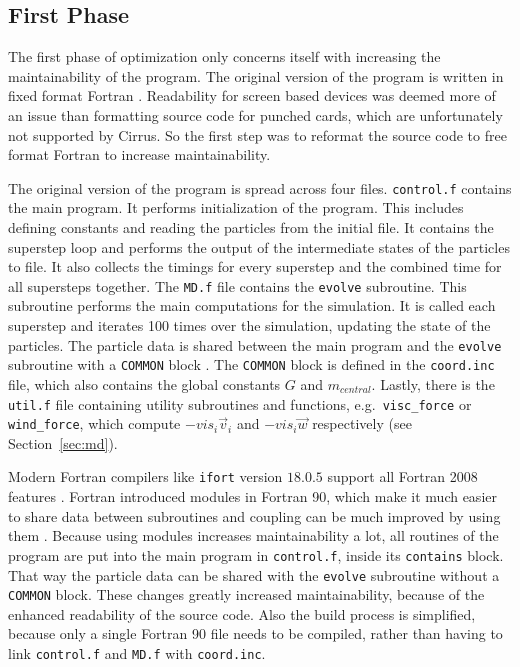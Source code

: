 \documentclass[twoside,11pt]{article}
\begin{document}
\subsection{First Phase} %
\label{subsec:p1}

The first phase of optimization only concerns itself with increasing
the maintainability of the program.
The original version of the program is written in fixed format
Fortran \citep[see e.g.][for free vs.\ fixed format Fortran]
{fortran_free_fixed}.
Readability for screen based devices was deemed more of an issue than
formatting source code for punched cards, which are unfortunately not
supported by Cirrus.
So the first step was to reformat the source code to free format
Fortran to increase maintainability.

The original version of the program is spread across four files.
\texttt{control.f} contains the main program.
It performs initialization of the program.
This includes defining constants and reading the particles from the
initial file.
It contains the superstep loop and performs the output of the
intermediate states of the particles to file.
It also collects the timings for every superstep and the combined
time for all supersteps together.
The \texttt{MD.f} file contains the \texttt{evolve} subroutine.
This subroutine performs the main computations for the simulation.
It is called each superstep and iterates 100 times over the
simulation, updating the state of the particles.
The particle data is shared between the main program and the
\texttt{evolve} subroutine with a \texttt{COMMON} block
\citep[see e.g.][]{fortran_common}.
The \texttt{COMMON} block is defined in the \texttt{coord.inc} file,
which also contains the global constants $G$ and $m_{central}$.
Lastly, there is the \texttt{util.f} file containing utility
subroutines and functions, e.g.\ \texttt{visc\_force} or
\texttt{wind\_force}, which compute $-vis_i\vec{v}_i$ and
$-vis_i\vec{w}$ respectively (see Section~\ref{sec:md}).

Modern Fortran compilers like \texttt{ifort} version $18.0.5$ support
all Fortran 2008 features \citep{ifort18}.
Fortran introduced modules in Fortran 90, which make it much easier
to share data between subroutines and coupling can be much improved by
using them \citep{fortran_modules}.
Because using modules increases maintainability a lot, all routines
of the program are put into the main program in \texttt{control.f},
inside its \texttt{contains} block.
That way the particle data can be shared with the \texttt{evolve}
subroutine without a \texttt{COMMON} block.
These changes greatly increased maintainability, because of the
enhanced readability of the source code.
Also the build process is simplified, because only a single
Fortran 90 file needs to be compiled, rather than having to link
\texttt{control.f} and \texttt{MD.f} with \texttt{coord.inc}.
\end{document}
